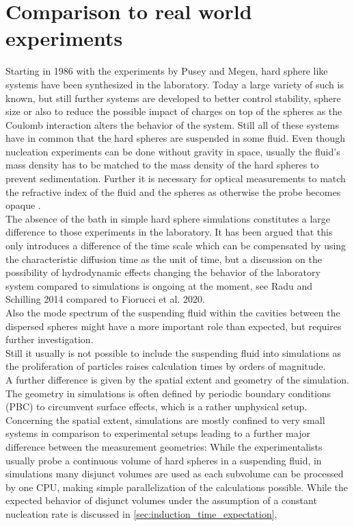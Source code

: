\section{Comparison to real world experiments} 
\label{sec:comparison}

Starting in 1986 with the experiments by Pusey and Megen\cite{Pusey1986}, hard sphere like systems have been synthesized in the laboratory. Today a large variety of such is known, but still further systems are developed to better control stability, sphere size or also to reduce the possible impact of charges on top of the spheres as the Coulomb interaction alters the behavior of the system. Still all of these systems have in common that the hard spheres are suspended in some fluid. Even though nucleation experiments can be done without gravity in space\cite{Doherty1998}, usually the fluid's mass density has to be matched to the mass density of the hard spheres to prevent sedimentation. Further it is necessary for optical measurements to match the refractive index of the fluid and the spheres as otherwise the probe becomes opaque .\\

The absence of the bath in simple hard sphere simulations constitutes a large difference to those experiments in the laboratory. It has been argued that this only introduces a difference of the time scale which can be compensated by using the characteristic diffusion time as the unit of time, but a discussion on the possibility of hydrodynamic effects changing the behavior of the laboratory system compared to simulations is ongoing at the moment, see Radu and Schilling 2014\cite{Radu2014} compared to Fiorucci et al. 2020\cite{Fiorucci2020a}.\\
Also the mode spectrum of the suspending fluid within the cavities between the dispersed spheres might have a more important role 
than expected, but requires further investigation.\\ 
Still it usually is not possible to include the suspending fluid into simulations as the proliferation of particles raises calculation times by orders of magnitude.\\

A further difference is given by the spatial extent and geometry of the simulation. The geometry in simulations is often defined by periodic boundary conditions (PBC) to circumvent surface effects, which is a rather unphysical setup.\\ 
Concerning the spatial extent, simulations are mostly confined to very small systems in comparison to experimental setups leading to a further major difference between the measurement geometries: While the experimentalists usually probe a continuous volume of hard spheres in a suspending fluid, in simulations many disjunct volumes are used as each subvolume can be processed by one CPU, making simple parallelization of the calculations possible. While the expected behavior of disjunct volumes under the assumption of a constant nucleation rate is discussed in \autoref{sec:induction_time_expectation},













